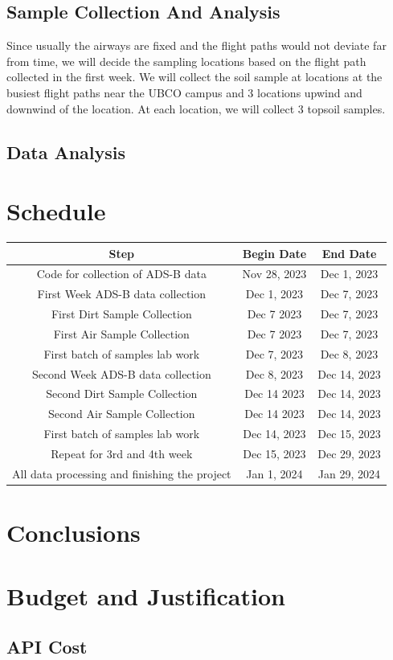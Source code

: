\documentclass[12pt]{article}
\begin{document}


\subsection{Sample Collection And Analysis}
Since usually the airways are fixed and the flight paths would not deviate far from time, we will decide the sampling locations based on the flight path collected in the first week. We will collect the soil sample at locations at the busiest flight paths near the UBCO campus and 3 locations upwind and downwind of the location. At each location, we will collect 3 topsoil samples.  
\subsection{Data Analysis}
\section{Schedule}
\begin{center}
\begin{tabular}{|c|c|c|}
 \hline
 \textbf{Step} & \textbf{Begin Date} & \textbf{End Date} \\
 \hline \hline
Code for collection of ADS-B data & Nov 28, 2023 & Dec 1, 2023 \\
\hline
First Week ADS-B data collection & Dec 1, 2023 & Dec 7, 2023 \\
\hline
First Dirt Sample Collection & Dec 7 2023 & Dec 7, 2023 \\
\hline
First Air Sample Collection & Dec 7 2023 & Dec 7, 2023 \\
\hline
First batch of samples lab work & Dec 7, 2023 & Dec 8, 2023 \\ 
\hline
Second Week ADS-B data collection & Dec 8, 2023 & Dec 14, 2023 \\
\hline
Second Dirt Sample Collection & Dec 14 2023 & Dec 14, 2023 \\
\hline
Second Air Sample Collection & Dec 14 2023 & Dec 14, 2023 \\
\hline
First batch of samples lab work & Dec 14, 2023 & Dec 15, 2023 \\ 
\hline
Repeat for 3rd and 4th week & Dec 15, 2023 & Dec 29, 2023\\
\hline
All data processing and finishing the project& Jan 1, 2024 & Jan 29, 2024\\
\hline
\end{tabular}
\end{center}
\section{Conclusions}
\section{Budget and Justification}
\subsection{API Cost}\\

\newpage
\printbibliography
\end{document}
